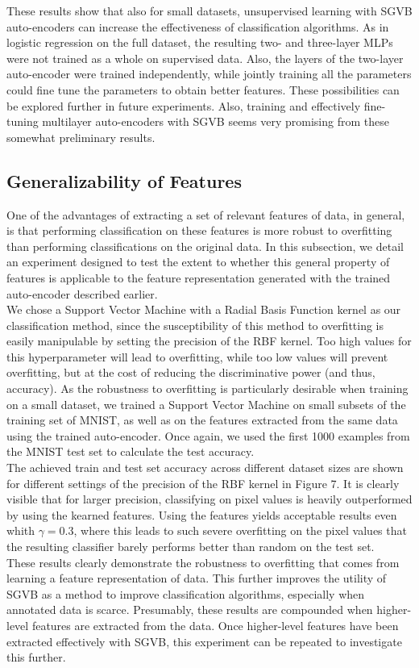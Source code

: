 \documentclass{article}
\begin{document}
These results show that also for small datasets, unsupervised learning with SGVB auto-encoders can increase the effectiveness of classification algorithms. As in logistic regression on the full dataset, the resulting two- and three-layer MLPs were not trained as a whole on supervised data. Also, the layers of the two-layer auto-encoder were trained independently, while jointly training all the parameters could fine tune the parameters to obtain better features. These possibilities can be explored further in future experiments. Also, training and effectively fine-tuning multilayer auto-encoders with SGVB seems very promising from these somewhat preliminary results. 

\subsection{Generalizability of Features}

One of the advantages of extracting a set of relevant features of data, in general, is that performing classification on these features is more robust to overfitting than performing classifications on the original data.  In this subsection, we detail an experiment designed to test the extent to whether this general property of features is applicable to the feature representation generated with the trained auto-encoder described earlier.\\
We chose a Support Vector Machine with a Radial Basis Function kernel as our classification method, since the susceptibility of this method to overfitting is easily manipulable by setting the precision of the RBF kernel. Too high values for this hyperparameter will lead to overfitting, while too low values will prevent overfitting, but at the cost of reducing the discriminative power (and thus, accuracy). As the robustness to overfitting is particularly desirable when training on a small dataset, we trained a Support Vector Machine on small subsets of the training set of MNIST, as well as on the features extracted from the same data using the trained auto-encoder. Once again, we used the first 1000 examples from the MNIST test set to calculate the test accuracy.\\
The achieved train and test set accuracy across different dataset sizes are shown for different settings of the precision of the RBF kernel in Figure 7. It is clearly visible that for larger precision, classifying on pixel values is heavily outperformed by using the kearned features. Using the features yields acceptable results even whith $\gamma = 0.3$, where this leads to such severe overfitting on the pixel values that the resulting classifier barely performs better than random on the test set.\\
These results clearly demonstrate the robustness to overfitting that comes from learning a feature representation of data. This further improves the utility of SGVB as a method to improve classification algorithms, especially when annotated data is scarce. Presumably, these results are compounded when higher-level features are extracted from the data. Once higher-level features have been extracted effectively with SGVB, this experiment can be repeated to investigate this further.
\end{document}

